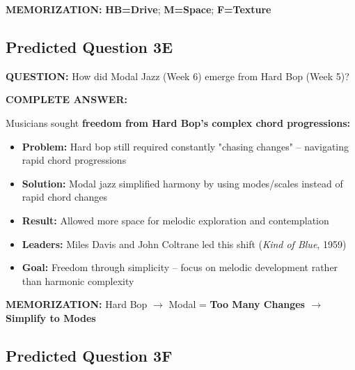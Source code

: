 \documentclass[11pt]{article}
\begin{document}
\textbf{MEMORIZATION:} \textcolor{hardbop}{\textbf{HB=Drive}}; \textcolor{modal}{\textbf{M=Space}}; \textcolor{freejazz}{\textbf{F=Texture}}

\subsection*{Predicted Question 3E}

\begin{mdframed}[backgroundcolor=questioncolor!10, linewidth=2pt]
\textbf{\textcolor{questioncolor}{QUESTION:}} How did Modal Jazz (Week 6) emerge from Hard Bop (Week 5)?
\end{mdframed}

\begin{mdframed}[backgroundcolor=answercolor!10, linewidth=2pt]
\textbf{\textcolor{answercolor}{COMPLETE ANSWER:}}

Musicians sought \textbf{freedom from Hard Bop's complex chord progressions:}

\begin{itemize}[leftmargin=*, nosep]
    \item \textbf{Problem:} Hard bop still required constantly "chasing changes" – navigating rapid chord progressions
    \item \textbf{Solution:} Modal jazz simplified harmony by using modes/scales instead of rapid chord changes
    \item \textbf{Result:} Allowed more space for melodic exploration and contemplation
    \item \textbf{Leaders:} Miles Davis and John Coltrane led this shift (\textit{Kind of Blue}, 1959)
    \item \textbf{Goal:} Freedom through simplicity – focus on melodic development rather than harmonic complexity
\end{itemize}

\vspace{5pt}
\end{mdframed}

\textbf{MEMORIZATION:} Hard Bop $\rightarrow$ Modal = \textbf{Too Many Changes $\rightarrow$ Simplify to Modes}

\subsection*{Predicted Question 3F}
\end{document}
